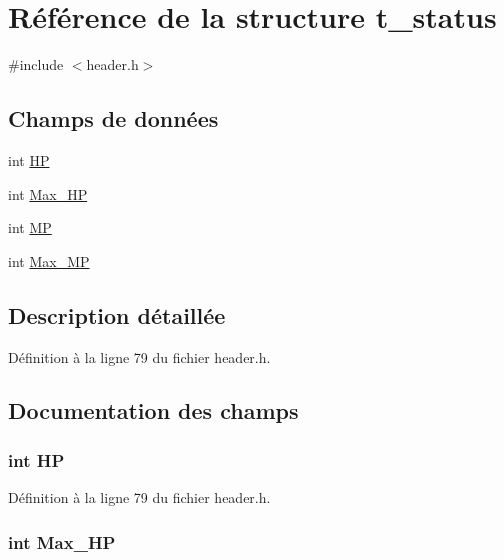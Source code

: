 \hypertarget{structt__status}{\section{Référence de la structure t\-\_\-status}
\label{structt__status}
}


{\ttfamily \#include $<$header.\-h$>$}

\subsection*{Champs de données}
\begin{DoxyCompactItemize}
\item 
int \hyperlink{structt__status_a58ca25ca6c9448a364b84539e42f1fa6}{H\-P}
\item 
int \hyperlink{structt__status_a3ae8966f5c827b3c74072acda8de72af}{Max\-\_\-\-H\-P}
\item 
int \hyperlink{structt__status_a30fc75b90111fc791752dd1add6ed991}{M\-P}
\item 
int \hyperlink{structt__status_a5e48a681ff3d92aaa0e643fbc32ab2f7}{Max\-\_\-\-M\-P}
\end{DoxyCompactItemize}


\subsection{Description détaillée}


Définition à la ligne 79 du fichier header.\-h.



\subsection{Documentation des champs}
\hypertarget{structt__status_a58ca25ca6c9448a364b84539e42f1fa6}{
\subsubsection[{H\-P}]{\setlength{\rightskip}{0pt plus 5cm}int H\-P}}\label{structt__status_a58ca25ca6c9448a364b84539e42f1fa6}


Définition à la ligne 79 du fichier header.\-h.

\hypertarget{structt__status_a3ae8966f5c827b3c74072acda8de72af}{
\subsubsection[{Max\-\_\-\-H\-P}]{\setlength{\rightskip}{0pt plus 5cm}int Max\-\_\-\-H\-P}}\label{structt__status_a3ae8966f5c827b3c74072acda8de72af}


